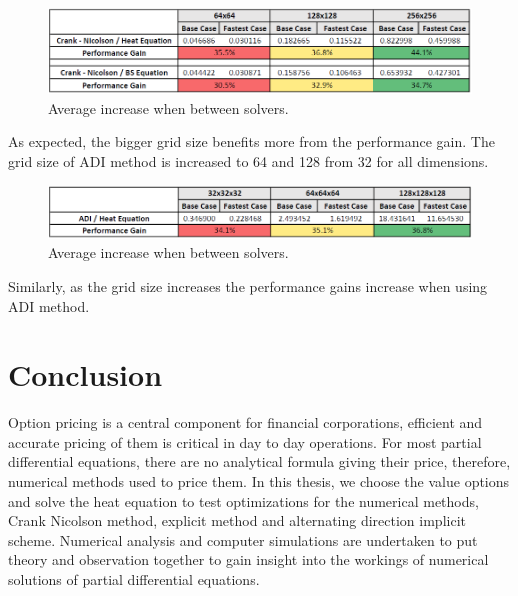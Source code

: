 \documentclass[12pt, oneside]{book}
\theoremstyle{plain}
\theoremstyle{definition}
\begin{document}
 \begin{figure}[!htb]
    \centering
        \includegraphics[scale=0.7]{gridTime.png}
    \caption{Average increase when between solvers.}
\end{figure}

As expected, the bigger grid size benefits more from the performance gain. The grid size of ADI method is increased to 64 and 128 from 32 for all dimensions.

 \begin{figure}[!htb]
    \centering
        \includegraphics[scale=0.7]{gridTimeADI.png}
    \caption{Average increase when between solvers.}
\end{figure}

Similarly, as the grid size increases the performance gains increase when using ADI method.
\chapter{Conclusion}

Option pricing is a central component for financial corporations, efficient and accurate pricing of them is critical in day to day operations. For  most  partial differential equations, there are no analytical formula giving their price, therefore, numerical methods used to price them. In this thesis, we choose the value options and solve the heat equation to test optimizations for the numerical methods, Crank Nicolson method, explicit method and alternating direction implicit scheme. Numerical analysis and computer simulations are undertaken to put theory and observation together to gain insight into the workings of numerical solutions of partial differential equations. 
\end{document}
